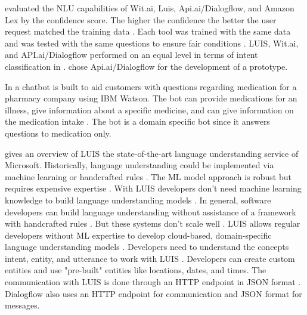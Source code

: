\citet{gregori2017evaluation} evaluated the NLU capabilities of Wit.ai, Luis, Api.ai/Dialogflow, and Amazon Lex
by the confidence score. 
The higher the confidence the better the user request matched the training data \citet{gregori2017evaluation}.
Each tool was trained with the same data and was tested with the same questions to ensure fair conditions \citet{gregori2017evaluation}.
LUIS, Wit.ai, and API.ai/Dialogflow performed on an equal level in terms of intent classification in \citet{gregori2017evaluation}.
\citet{gregori2017evaluation} chose Api.ai/Dialogflow for the development of a prototype.

In \citet{pharmacybot} a chatbot is built to aid customers with questions regarding medication for a 
pharmacy company using IBM Watson.
The bot can provide medications for an illness, give information about a specific medicine, and can 
give information on the medication intake \cite{pharmacybot}.
The bot is a domain specific bot since it answers questions to medication only.


\citet{luis2015williams} gives an overview of LUIS the state-of-the-art language understanding service of Microsoft.
Historically, language understanding could be implemented via machine learning or handcrafted rules \cite{luis2015williams}.
The ML model approach is robust but requires expensive expertise \cite{luis2015williams}. 
With LUIS developers don't need machine learning knowledge to build language understanding models \cite{luis2015williams}.
In general, software developers can build language understanding without assistance of a framework
with handcrafted rules \citet{luis2015williams}. 
But these systems don't scale well \cite{luis2015williams}.
LUIS allows regular developers without ML expertise to develop cloud-based, domain-specific language 
understanding models \cite{luis2015williams}.
Developers need to understand the concepts intent, entity, and utterance to work with LUIS \cite{luis2015williams}.
Developers can create custom entities and use "pre-built" entities like locations, dates, and times.
The communication with LUIS is done through an HTTP endpoint in JSON format \cite{luis2015williams}. 
Dialogflow also uses an HTTP endpoint for communication and JSON format for messages. 

